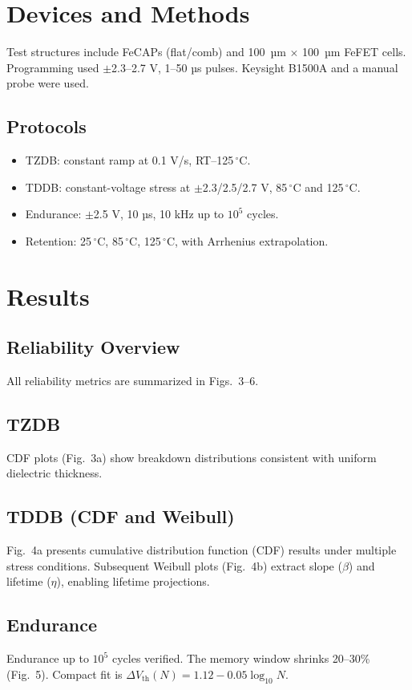 \documentclass[conference]{IEEEtran}
\begin{document}
\section{Devices and Methods}
Test structures include FeCAPs (flat/comb) and 100~µm $\times$ 100~µm FeFET cells.  
Programming used $\pm$2.3–2.7 V, 1–50 µs pulses. Keysight B1500A and a manual probe were used.

\subsection{Protocols}
\begin{itemize}
  \item TZDB: constant ramp at 0.1 V/s, RT–125\,$^\circ$C.  
  \item TDDB: constant-voltage stress at $\pm$2.3/2.5/2.7 V, 85\,$^\circ$C and 125\,$^\circ$C.  
  \item Endurance: $\pm$2.5 V, 10 µs, 10 kHz up to $10^5$ cycles.  
  \item Retention: 25\,$^\circ$C, 85\,$^\circ$C, 125\,$^\circ$C, with Arrhenius extrapolation.  
\end{itemize}

\section{Results}

\subsection{Reliability Overview}
All reliability metrics are summarized in Figs.~3–6.

\subsection{TZDB}
CDF plots (Fig.~3a) show breakdown distributions consistent with uniform dielectric thickness.

\subsection{TDDB (CDF and Weibull)}
Fig.~4a presents cumulative distribution function (CDF) results under multiple stress conditions.  
Subsequent Weibull plots (Fig.~4b) extract slope ($\beta$) and lifetime ($\eta$), enabling lifetime projections.  

\subsection{Endurance}
Endurance up to $10^5$ cycles verified.  
The memory window shrinks 20–30\% (Fig.~5).  
Compact fit is $\Delta V_{\text{th}}(N)=1.12 - 0.05\log_{10}N$.
\end{document}
